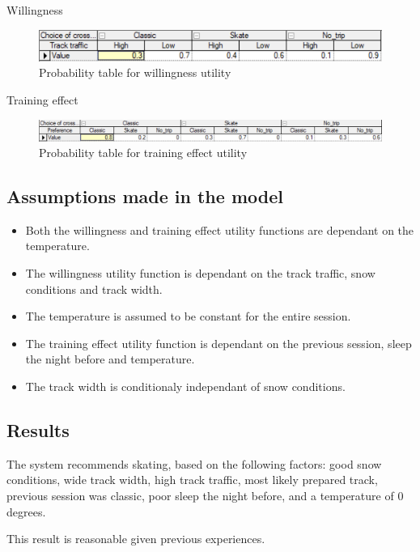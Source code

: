 \documentclass{article}
\begin{document}
\newpage

Willingness

\begin{figure}[h]
    \centering
    \includegraphics[width=\linewidth]{willingness.png}
    \caption{Probability table for willingness utility}
    \label{fig:image5}
\end{figure}

Training effect

\begin{figure}[h]
    \centering
    \includegraphics[width=\linewidth]{training_effect.png}
    \caption{Probability table for training effect utility}
    \label{fig:image6}
\end{figure}

\subsection*{Assumptions made in the model}

\begin{itemize}
    \item Both the willingness and training effect utility functions are dependant on the temperature.
    \item The willingness utility function is dependant on the track traffic, snow conditions and track width.
    \item The temperature is assumed to be constant for the entire session.
    \item The training effect utility function is dependant on the previous session, sleep the night before and temperature.
    \item The track width is conditionaly independant of snow conditions.
\end{itemize}

\subsection*{Results}

The system recommends skating, based on the following factors: good snow conditions, wide track width, high track traffic, most likely prepared track, previous session was classic, poor sleep the night before, and a temperature of 0 degrees.

\medskip

This result is reasonable given previous experiences.
\end{document}

